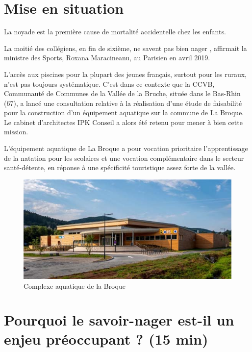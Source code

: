 

\section*{Mise en situation}

La noyade est la première cause de mortalité accidentelle chez les enfants.

\og La moitié des collégiens, en fin de sixième, ne savent pas bien nager \fg, affirmait la ministre des Sports, Roxana Maracineanu, au Parisien en avril 2019.

L'accès aux piscines pour la plupart des jeunes français, surtout pour les ruraux, n'est pas toujours systématique. C'est dans ce contexte que la CCVB, Communauté de Communes de la Vallée de la Bruche, située dans le Bas-Rhin (67), a lancé une consultation relative à la réalisation d'une étude de faisabilité pour la construction d'un équipement aquatique sur
la commune de La Broque. Le cabinet d'architectes IPK Conseil a alors été retenu pour mener à bien cette mission.

L'équipement aquatique de La Broque a pour vocation prioritaire l'apprentissage de la natation pour les scolaires et une vocation complémentaire dans le secteur santé-détente, en réponse à une spécificité touristique assez forte de la vallée.

\begin{figure}[ht!]
\begin{center}
 \includegraphics[width=0.7\linewidth]{img/fig001}
\end{center}
\label{fig001}
\caption{Complexe aquatique de la Broque}
\end{figure}

\vspace{-1cm}

\section{Pourquoi le savoir-nager est-il un enjeu préoccupant ? (15 min)}

